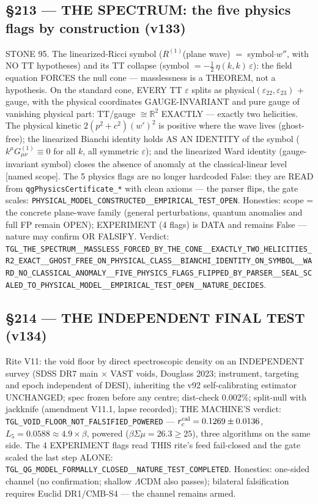\documentclass[11pt]{article}
\theoremstyle{definition}\newtheorem{deriv}{Derivation}
\begin{document}
\subsection*{\S213 --- THE SPECTRUM: the five physics flags by construction (v133)}STONE 95. The linearized-Ricci symbol ($R^{(1)}$(plane wave) $=$ symbol$\cdot w''$, with NO TT hypotheses) and its TT collapse (symbol $= -\tfrac12\,\eta(k,k)\,\varepsilon$): the field equation FORCES the null cone --- masslessness is a THEOREM, not a hypothesis. On the standard cone, EVERY TT $\varepsilon$ splits as physical$(\varepsilon_{22},\varepsilon_{23})$ + gauge, with the physical coordinates GAUGE-INVARIANT and pure gauge of vanishing physical part: TT/gauge $\cong\mathbb{R}^2$ EXACTLY --- exactly two helicities. The physical kinetic $2(p^2+c^2)(w')^2$ is positive where the wave lives (ghost-free); the linearized Bianchi identity holds AS AN IDENTITY of the symbol ($k^\mu G^{(1)}_{\mu\nu}\equiv 0$ for all $k$, all symmetric $\varepsilon$); and the linearized Ward identity (gauge-invariant symbol) closes the absence of anomaly at the classical-linear level [named scope]. The 5 physics flags are no longer hardcoded False: they are READ from \texttt{qgPhysicsCertificate\_*} with clean axioms --- the parser flips, the gate scales: \texttt{PHYSICAL\_MODEL\_CONSTRUCTED\_\_EMPIRICAL\_TEST\_OPEN}. Honesties: scope = the concrete plane-wave family (general perturbations, quantum anomalies and full FP remain OPEN); EXPERIMENT (4 flags) is DATA and remains False --- nature may confirm OR FALSIFY. Verdict: \texttt{TGL\_THE\_SPECTRUM\_\_MASSLESS\_FORCED\_BY\_THE\_CONE\_\_EXACTLY\_TWO\_HELICITIES\_R2\_EXACT\_\_GHOST\_FREE\_ON\_PHYSICAL\_CLASS\_\_BIANCHI\_IDENTITY\_ON\_SYMBOL\_\_WARD\_NO\_CLASSICAL\_ANOMALY\_\_FIVE\_PHYSICS\_FLAGS\_FLIPPED\_BY\_PARSER\_\_SEAL\_SCALED\_TO\_PHYSICAL\_MODEL\_\_EMPIRICAL\_TEST\_OPEN\_\_NATURE\_DECIDES}.

\subsection*{\S214 --- THE INDEPENDENT FINAL TEST (v134)}Rite V11: the void floor by direct spectroscopic density on an INDEPENDENT survey (SDSS DR7 main $\times$ VAST voids, Douglass 2023; instrument, targeting and epoch independent of DESI), inheriting the v92 self-calibrating estimator UNCHANGED; spec frozen before any centre; dist-check 0.002\%; split-null with jackknife (amendment V11.1, lapse recorded); THE MACHINE'S verdict: \texttt{TGL\_VOID\_FLOOR\_NOT\_FALSIFIED\_POWERED} --- $r_c^{\rm cal}=0.1269\pm0.0136$, $L_5=0.0588\approx 4.9\times\beta$, powered ($\beta\Sigma\mu=26.3\ge25$), three algorithms on the same side. The 4 EXPERIMENT flags read THIS rite's feed fail-closed and the gate scaled the last step ALONE: \texttt{TGL\_QG\_MODEL\_FORMALLY\_CLOSED\_\_NATURE\_TEST\_COMPLETED}. Honesties: one-sided channel (no confirmation; shallow $\Lambda$CDM also passes); bilateral falsification requires Euclid DR1/CMB-S4 --- the channel remains armed.
\end{document}
